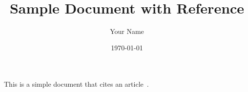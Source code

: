 \documentclass{article}
\title{Sample Document with Reference}
\author{Your Name}
\date{\today}
\begin{document}
\maketitle

This is a simple document that cites an article~\cite{lamport1994}.



\end{document}
